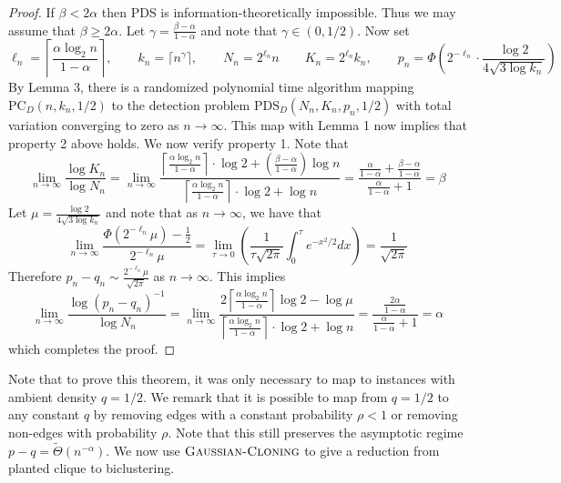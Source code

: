 \documentclass[11pt]{article}
\begin{document}
\begin{proof}
If $\beta < 2\alpha$ then PDS is information-theoretically impossible. Thus we may assume that $\beta \ge 2\alpha$. Let $\gamma = \frac{\beta - \alpha}{1 - \alpha}$ and note that $\gamma \in (0, 1/2)$. Now set
$$\ell_n = \left\lceil \frac{\alpha \log_2 n}{1 - \alpha} \right\rceil, \quad \quad k_n = \lceil n^{\gamma} \rceil, \quad \quad N_n = 2^{\ell_n} n \quad \quad K_n = 2^{\ell_n} k_n, \quad \quad p_n = \Phi\left( 2^{-\ell_n} \cdot \frac{\log 2}{4 \sqrt{3 \log k_n}} \right)$$
By Lemma 3, there is a randomized polynomial time algorithm mapping $\text{PC}_D(n, k_n, 1/2)$ to the detection problem $\text{PDS}_D(N_n, K_n, p_n, 1/2)$ with total variation converging to zero as $n \to \infty$. This map with Lemma 1 now implies that property 2 above holds. We now verify property 1. Note that
$$\lim_{n \to \infty} \frac{\log K_n}{\log N_n} = \lim_{n \to \infty} \frac{\left\lceil \frac{\alpha \log_2 n}{1 - \alpha} \right\rceil \cdot \log 2 + \left( \frac{\beta - \alpha}{1 - \alpha} \right) \log n}{\left\lceil \frac{\alpha \log_2 n}{1 - \alpha} \right\rceil\cdot \log 2 + \log n} = \frac{\frac{\alpha}{1 - \alpha} + \frac{\beta - \alpha}{1 - \alpha}}{\frac{\alpha}{1 - \alpha} + 1} = \beta$$
Let $\mu = \frac{\log 2}{4 \sqrt{3 \log k_n}}$ and note that as $n \to \infty$, we have that
$$\lim_{n \to \infty} \frac{\Phi\left( 2^{-\ell_n} \mu \right) - \frac{1}{2}}{2^{-\ell_n} \mu} = \lim_{\tau \to 0} \left( \frac{1}{\tau \sqrt{2\pi}} \int_0^\tau e^{-x^2/2} dx \right) = \frac{1}{\sqrt{2\pi}}$$
Therefore $p_n - q_n \sim \frac{2^{-\ell_n} \mu}{\sqrt{2\pi}}$ as $n \to \infty$. This implies
$$\lim_{n \to \infty} \frac{\log (p_n - q_n)^{-1}}{\log N_n} = \lim_{n \to \infty} \frac{2\left\lceil \frac{\alpha \log_2 n}{1 - \alpha} \right\rceil \log 2 - \log \mu}{\left\lceil \frac{\alpha \log_2 n}{1 - \alpha} \right\rceil\cdot \log 2 + \log n} = \frac{\frac{2\alpha}{1 - \alpha}}{\frac{\alpha}{1 - \alpha} + 1} = \alpha$$
which completes the proof.
\end{proof}

Note that to prove this theorem, it was only necessary to map to instances with ambient density $q = 1/2$. We remark that it is possible to map from $q = 1/2$ to any constant $q$ by removing edges with a constant probability $\rho < 1$ or removing non-edges with probability $\rho$. Note that this still preserves the asymptotic regime $p - q = \tilde{\Theta}(n^{-\alpha})$. We now use $\textsc{Gaussian-Cloning}$ to give a reduction from planted clique to biclustering.
\end{document}
